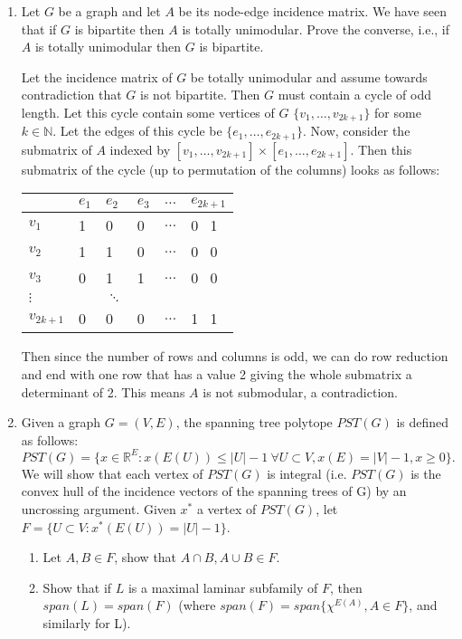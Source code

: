 \documentclass[11pt]{article}
\newcommand{\setR}{\mathbb{R}}
\begin{document}
\begin{enumerate}[1)]
\item Let $G$ be a graph and let $A$ be its node-edge incidence matrix. We have seen that if $G$ is
bipartite then $A$ is totally unimodular. Prove the converse, i.e., if $A$ is totally unimodular then $G$
is bipartite.

\begin{solution}
Let the incidence matrix of $G$ be totally unimodular and assume towards contradiction that $G$ is not bipartite. Then $G$ must contain a cycle of odd length. Let this cycle contain some vertices of $G$ $\{v_1, \hdots, v_{2k+1}\}$ for some $k \in \mathbb{N}$. Let the edges of this cycle be $\{e_1, \hdots, e_{2k+1}\}$. Now, consider the submatrix of $A$ indexed by $[v_1, \hdots, v_{2k+1}] \times [e_1, \hdots, e_{2k+1}]$.  
Then this submatrix of the cycle (up to permutation of the columns) looks as follows: \\

\begin{tabular}{l | l l l l l }
 & $e_1$ & $e_2$ &$e_3$ & $\hdots$ & $e_{2k+1}$ \\
 \midrule
$v_1$ & 1 & 0 & 0 &  $\hdots$ & 0 \ 1 \\
$v_2$ & 1 & 1 & 0 & $\hdots$ & 0 \ 0 \\
$v_3$ & 0 & 1 & 1 & $\hdots$ &  0 \ 0  \\
$\vdots$ & & $\ddots$ & & &  \\
$v_{2k+1}$ & 0 & 0 & 0 & $\hdots$ & 1 \ 1
\end{tabular}


Then since the number of rows and columns is odd, we can do row reduction and end with one row that has a value 2 giving the whole submatrix a determinant of 2. This means $A$ is not submodular, a contradiction. 
\end{solution}


\item Given a graph $G=(V,E)$, the spanning tree polytope $PST(G)$ is defined as follows:
$$PST (G) = \{x∈\setR^E : x(E(U)) ≤|U|−1 \ ∀U ⊂V, x(E) = |V|−1, x≥0\}.$$
We will show that each vertex of $PST(G)$ is integral (i.e. $PST (G)$ is the convex hull of the incidence
vectors of the spanning trees of G) by an uncrossing argument. 
Given $x^*$ a vertex of $PST (G)$, let $F= \{U ⊂V : x^*(E(U)) = |U|−1\}$.
\begin{enumerate}
\item Let $A,B ∈F$, show that $A∩B,A∪B ∈F$.
\item Show that if $L$ is a maximal laminar subfamily of $F$, then $span(L) = span(F)$ (where
$span(F) = span\{χ^{E(A)},A∈F\}$, and similarly for L).
\end{enumerate}







\end{enumerate}



  
\end{document}
